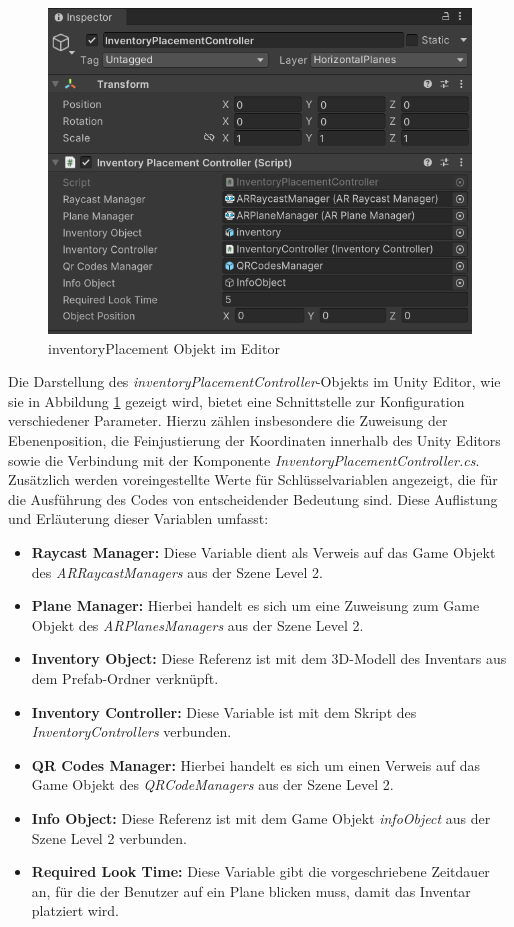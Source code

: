 \begin{figure}[h]
\centering
\includegraphics[scale=0.8]{images/invPlace_Editor}
\caption{inventoryPlacement Objekt im Editor}
\label{fig:inventoryPlacementController_Editor}
\end{figure}

Die Darstellung des \textit{inventoryPlacementController}-Objekts im Unity Editor, wie sie in Abbildung \ref{fig:inventoryPlacementController_Editor}
gezeigt wird, bietet eine Schnittstelle zur Konfiguration verschiedener Parameter. Hierzu zählen insbesondere die Zuweisung
der Ebenenposition, die Feinjustierung der Koordinaten innerhalb des Unity Editors sowie die Verbindung mit der Komponente
\textit{InventoryPlacementController.cs}. Zusätzlich werden voreingestellte Werte für Schlüsselvariablen angezeigt, die
für die Ausführung des Codes von entscheidender Bedeutung sind. Diese Auflistung und Erläuterung dieser Variablen umfasst:
\begin{itemize}
    \item \textbf{Raycast Manager:} Diese Variable dient als Verweis auf das Game Objekt des \textit{ARRaycastManagers}
    aus der Szene Level 2.
    \item \textbf{Plane Manager:} Hierbei handelt es sich um eine Zuweisung zum Game Objekt des \textit{ARPlanesManagers}
    aus der Szene Level 2.
    \item \textbf{Inventory Object:} Diese Referenz ist mit dem 3D-Modell des Inventars aus dem Prefab-Ordner verknüpft.
    \item \textbf{Inventory Controller:} Diese Variable ist mit dem Skript des \textit{InventoryControllers} verbunden.
    \item \textbf{QR Codes Manager:} Hierbei handelt es sich um einen Verweis auf das Game Objekt des \textit{QRCodeManagers}
    aus der Szene Level 2.
    \item \textbf{Info Object:} Diese Referenz ist mit dem Game Objekt \textit{infoObject} aus der Szene Level 2 verbunden.
    \item \textbf{Required Look Time:} Diese Variable gibt die vorgeschriebene Zeitdauer an, für die der Benutzer auf ein
    Plane blicken muss, damit das Inventar platziert wird.
\end{itemize}

